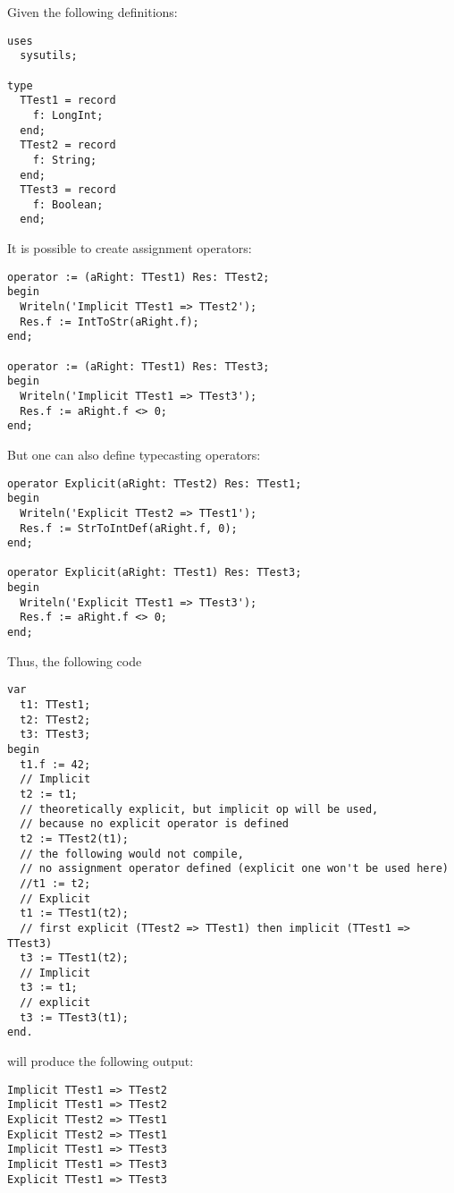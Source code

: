 Given the following definitions:
\begin{verbatim}
uses
  sysutils;

type
  TTest1 = record
    f: LongInt;
  end;
  TTest2 = record
    f: String;
  end;
  TTest3 = record
    f: Boolean;
  end;
\end{verbatim}
It is possible to create assignment operators:
\begin{verbatim}
operator := (aRight: TTest1) Res: TTest2;
begin
  Writeln('Implicit TTest1 => TTest2');
  Res.f := IntToStr(aRight.f);
end;

operator := (aRight: TTest1) Res: TTest3;
begin
  Writeln('Implicit TTest1 => TTest3');
  Res.f := aRight.f <> 0;
end;
\end{verbatim}
But one can also define typecasting operators:
\begin{verbatim}
operator Explicit(aRight: TTest2) Res: TTest1;
begin
  Writeln('Explicit TTest2 => TTest1');
  Res.f := StrToIntDef(aRight.f, 0);
end;

operator Explicit(aRight: TTest1) Res: TTest3;
begin
  Writeln('Explicit TTest1 => TTest3');
  Res.f := aRight.f <> 0;
end;
\end{verbatim}
Thus, the following code
\begin{verbatim}
var
  t1: TTest1;
  t2: TTest2;
  t3: TTest3;
begin
  t1.f := 42;
  // Implicit
  t2 := t1; 
  // theoretically explicit, but implicit op will be used, 
  // because no explicit operator is defined
  t2 := TTest2(t1); 
  // the following would not compile, 
  // no assignment operator defined (explicit one won't be used here)
  //t1 := t2; 
  // Explicit
  t1 := TTest1(t2); 
  // first explicit (TTest2 => TTest1) then implicit (TTest1 => TTest3)
  t3 := TTest1(t2); 
  // Implicit
  t3 := t1; 
  // explicit
  t3 := TTest3(t1); 
end.
\end{verbatim}
will produce the following output:
\begin{verbatim}
Implicit TTest1 => TTest2
Implicit TTest1 => TTest2
Explicit TTest2 => TTest1
Explicit TTest2 => TTest1
Implicit TTest1 => TTest3
Implicit TTest1 => TTest3
Explicit TTest1 => TTest3
\end{verbatim}

